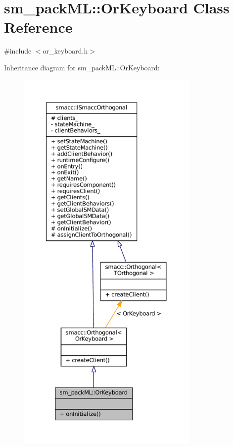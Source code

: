 \hypertarget{classsm__packML_1_1OrKeyboard}{}\section{sm\+\_\+pack\+ML\+:\+:Or\+Keyboard Class Reference}
\label{classsm__packML_1_1OrKeyboard}


{\ttfamily \#include $<$or\+\_\+keyboard.\+h$>$}



Inheritance diagram for sm\+\_\+pack\+ML\+:\+:Or\+Keyboard\+:
\nopagebreak
\begin{figure}[H]
\begin{center}
\leavevmode
\includegraphics[height=550pt]{classsm__packML_1_1OrKeyboard__inherit__graph}
\end{center}
\end{figure}


